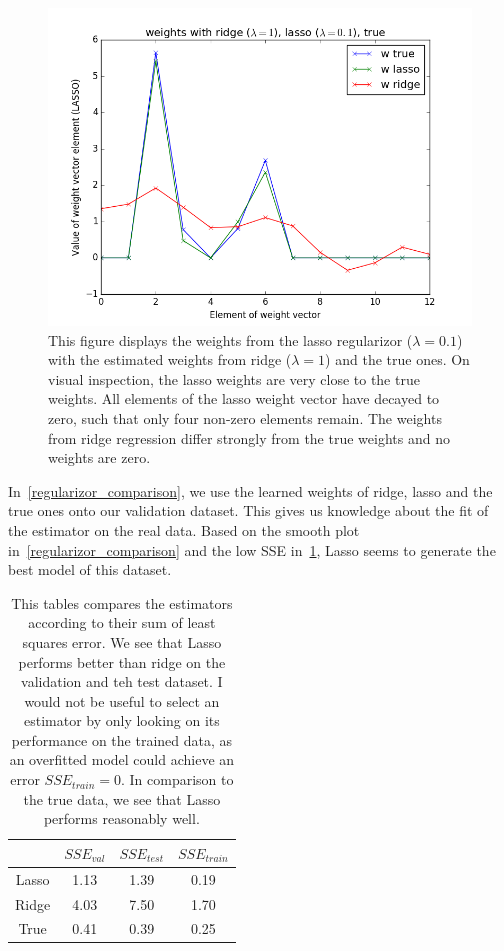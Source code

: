 \begin{figure}[!ht]
   \centering
   \includegraphics[width=0.9\linewidth]{figures/lasso_weights}
   \caption{This figure displays the weights from the lasso regularizor ($\lambda = 0.1$) with the estimated weights from ridge ($\lambda = 1$) and the true ones. On visual inspection, the lasso weights are very close to the true weights. All elements of the lasso weight vector have decayed to zero, such that only four non-zero elements remain. The weights from ridge regression differ strongly from the true weights and no weights are zero.}
\label{lasso_weights}
\end{figure}

In~\cref{regularizor_comparison}, we use the learned weights of ridge, lasso and the true ones onto our validation dataset. This gives us knowledge about the fit of the estimator on the real data.
Based on the smooth plot in~\cref{regularizor_comparison} and the low SSE in~\cref{table:sse_weights}, Lasso seems to generate the best model of this dataset. 
 
\begin{table}[ht!]
\centering
\begin{tabular}{||c c c c||}  
 \hline
 \ & $SSE_{val}$ & $SSE_{test}$ & $SSE_{train}$ \\ [0.5ex] 
 \hline\hline
 Lasso & 1.13 & 1.39 & 0.19 \\ 
 \hline
 Ridge & 4.03 & 7.50 & 1.70 \\
 \hline
 True & 0.41 & 0.39 & 0.25 \\[1ex] 
 \hline
\end{tabular}
\caption{This tables compares the estimators according to their sum of least squares error. We see that Lasso performs better than ridge on the validation and teh test dataset. I would not be useful to select an estimator by only looking on its performance on the trained data, as an overfitted model could achieve an error $SSE_{train}=0$. In comparison to the true data, we see that Lasso performs reasonably well.}
\label{table:sse_weights}
\end{table}

